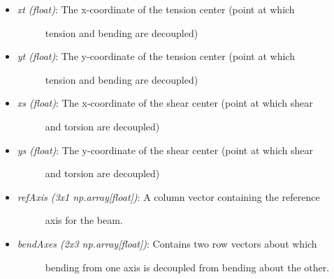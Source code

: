 \documentclass[letterpaper,10pt,english]{sphinxmanual}
\begin{document}
\begin{fulllineitems}
\begin{itemize}
\begin{description}
\end{description}

\item {} \begin{description}
\item[{\emph{xt (float)}: The x-coordinate of the tension center (point at which}] \leavevmode
tension and bending are decoupled)

\end{description}

\item {} \begin{description}
\item[{\emph{yt (float)}: The y-coordinate of the tension center (point at which}] \leavevmode
tension and bending are decoupled)

\end{description}

\item {} \begin{description}
\item[{\emph{xs (float)}: The x-coordinate of the shear center (point at which shear}] \leavevmode
and torsion are decoupled)

\end{description}

\item {} \begin{description}
\item[{\emph{ys (float)}: The y-coordinate of the shear center (point at which shear}] \leavevmode
and torsion are decoupled)

\end{description}

\item {} \begin{description}
\item[{\emph{refAxis (3x1 np.array{[}float{]})}: A column vector containing the reference}] \leavevmode
axis for the beam.

\end{description}

\item {} \begin{description}
\item[{\emph{bendAxes (2x3 np.array{[}float{]})}: Contains two row vectors about which}] \leavevmode
bending from one axis is decoupled from bending about the other.

\end{description}


\end{itemize}
\end{fulllineitems}
\end{document}
